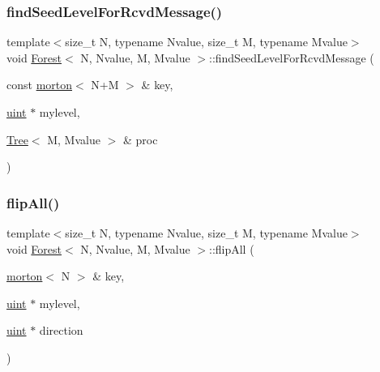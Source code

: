 \subsubsection{\texorpdfstring{find\+Seed\+Level\+For\+Rcvd\+Message()}{findSeedLevelForRcvdMessage()}}
{\footnotesize\ttfamily template$<$size\+\_\+t N, typename Nvalue, size\+\_\+t M, typename Mvalue$>$ \\
void \mbox{\hyperlink{classForest}{Forest}}$<$ N, Nvalue, M, Mvalue $>$\+::find\+Seed\+Level\+For\+Rcvd\+Message (\begin{DoxyParamCaption}\item[{const \mbox{\hyperlink{definitions_8h_af8682350bd8bb38ee9023f7a0a310add}{morton}}$<$ N+M $>$ \&}]{key,  }\item[{\mbox{\hyperlink{definitions_8h_a69aa29b598b851b0640aa225a9e5d61d}{uint}} $\ast$}]{mylevel,  }\item[{\mbox{\hyperlink{classTree}{Tree}}$<$ M, Mvalue $>$ \&}]{proc }\end{DoxyParamCaption})}

\mbox{\label{classForest_a8352dba9dd05111be3b6a4405d5f0425}} 
\subsubsection{\texorpdfstring{flip\+All()}{flipAll()}}
{\footnotesize\ttfamily template$<$size\+\_\+t N, typename Nvalue, size\+\_\+t M, typename Mvalue$>$ \\
void \mbox{\hyperlink{classForest}{Forest}}$<$ N, Nvalue, M, Mvalue $>$\+::flip\+All (\begin{DoxyParamCaption}\item[{\mbox{\hyperlink{definitions_8h_af8682350bd8bb38ee9023f7a0a310add}{morton}}$<$ N $>$ \&}]{key,  }\item[{\mbox{\hyperlink{definitions_8h_a69aa29b598b851b0640aa225a9e5d61d}{uint}} $\ast$}]{mylevel,  }\item[{\mbox{\hyperlink{definitions_8h_a69aa29b598b851b0640aa225a9e5d61d}{uint}} $\ast$}]{direction }\end{DoxyParamCaption})}

\mbox{\label{classForest_aaf141e0d99b8ca26265b1dfa57c12793}} 
